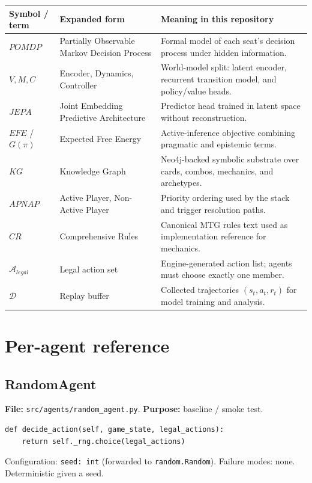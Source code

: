 \documentclass[11pt,a4paper]{article}
\begin{document}
\begin{table}[h]
\centering
\small
\begin{tabularx}{\linewidth}{l l X}
\toprule
\textbf{Symbol / term} & \textbf{Expanded form} & \textbf{Meaning in this repository} \\
\midrule
$POMDP$ & Partially Observable Markov Decision Process & Formal model of each seat's decision process under hidden information. \\
$V, M, C$ & Encoder, Dynamics, Controller & World-model split: latent encoder, recurrent transition model, and policy/value heads. \\
$JEPA$ & Joint Embedding Predictive Architecture & Predictor head trained in latent space without reconstruction. \\
$EFE$ / $G(\pi)$ & Expected Free Energy & Active-inference objective combining pragmatic and epistemic terms. \\
$KG$ & Knowledge Graph & Neo4j-backed symbolic substrate over cards, combos, mechanics, and archetypes. \\
$APNAP$ & Active Player, Non-Active Player & Priority ordering used by the stack and trigger resolution paths. \\
$CR$ & Comprehensive Rules & Canonical MTG rules text used as implementation reference for mechanics. \\
$\mathcal{A}_{legal}$ & Legal action set & Engine-generated action list; agents must choose exactly one member. \\
$\mathcal{D}$ & Replay buffer & Collected trajectories $(s_t, a_t, r_t)$ for model training and analysis. \\
\bottomrule
\end{tabularx}
\end{table}

\section{Per-agent reference}

\subsection{RandomAgent}
\textbf{File:} \texttt{src/agents/random\_agent.py}.  \textbf{Purpose:}
baseline / smoke test.

\begin{lstlisting}
def decide_action(self, game_state, legal_actions):
    return self._rng.choice(legal_actions)
\end{lstlisting}
%
Configuration: \texttt{seed: int} (forwarded to \texttt{random.Random}).
Failure modes: none.  Deterministic given a seed.
\end{document}
